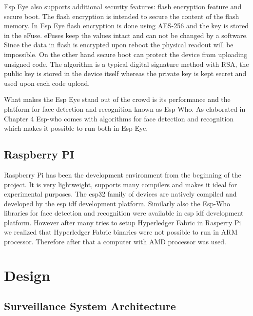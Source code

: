 Esp Eye also supports additional security features: flash encryption feature and secure boot. The flash encryption is intended to secure the content of the flash memory. In Esp Eye flash encryption is done using AES-256 and the key is stored in the eFuse. eFuses keep the values intact and can not be changed by a software. Since the data in flash is encrypted upon reboot the physical readout will be impossible. 
On the other hand secure boot can protect the device from uploading unsigned code. The algorithm is a typical digital signature method with RSA, the public key is stored in the device itself whereas the private key is kept secret and used upon each code upload. 

What makes the Esp Eye stand out of the crowd is its performance and the platform for face detection and recognition known as Esp-Who. As elaborated in Chapter 4 Esp-who comes with algorithms for face detection and recognition which makes it possible to run both in Esp Eye.

\subsection{Raspberry PI}

Raspberry Pi has been the development environment from the beginning of the project. It is very lightweight, supports many compilers and makes it ideal for experimental purposes. %
The esp32 family of devices are natively compiled and developed by the esp idf development platform.  Similarly also the Esp-Who libraries for face detection and recognition were available in esp idf development platform.
However after many tries to setup Hyperledger Fabric in Rasperry Pi we realized that Hyperledger Fabric binaries were not possible to run in ARM processor. Therefore after that a computer with AMD processor was used. 






\section{Design}

 


\subsection{Surveillance System Architecture}

